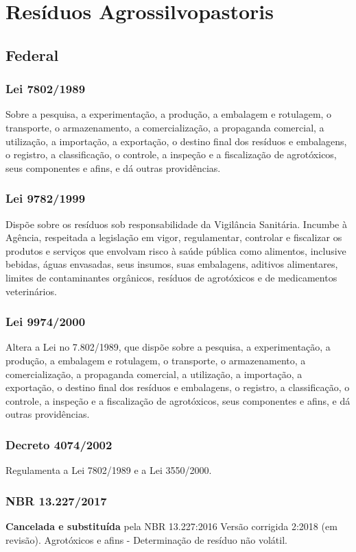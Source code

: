  
\section{Resíduos Agrossilvopastoris}
\begin{subapend}
	\subsection{Federal}
	\begin{subsubapend}
		\item \subsubsection{Lei 7802/1989}
		Sobre a pesquisa, a experimentação, a produção, a embalagem e rotulagem, o transporte, o armazenamento, a comercialização, a propaganda comercial, a utilização, a importação, a exportação, o destino final dos resíduos e embalagens, o registro, a classificação, o controle, a inspeção e a fiscalização de agrotóxicos, seus componentes e afins, e dá outras providências.
		\subsubsection{Lei 9782/1999}
		Dispõe sobre os resíduos sob responsabilidade da Vigilância Sanitária. Incumbe à Agência, respeitada a legislação em vigor, regulamentar, controlar e fiscalizar os produtos e serviços que envolvam risco à saúde pública como alimentos, inclusive bebidas, águas envasadas, seus insumos, suas embalagens, aditivos alimentares, limites de contaminantes orgânicos, resíduos de agrotóxicos e de medicamentos veterinários.
		\subsubsection{Lei 9974/2000}
		Altera a Lei no 7.802/1989, que dispõe sobre a pesquisa, a experimentação, a produção, a embalagem e rotulagem, o transporte, o armazenamento, a comercialização, a propaganda comercial, a utilização, a importação, a exportação, o destino final dos resíduos e embalagens, o registro, a classificação, o controle, a inspeção e a fiscalização de agrotóxicos, seus componentes e afins, e dá outras providências.
		\subsubsection{Decreto 4074/2002}
		Regulamenta a Lei 7802/1989 e a Lei 3550/2000.
		\subsubsection{NBR 13.227/2017}
			\textbf{Cancelada e substituída} pela NBR 13.227:2016 Versão corrigida 2:2018 (em revisão). Agrotóxicos e afins - Determinação de resíduo não volátil. 

\end{subsubapend}
\end{subapend}
